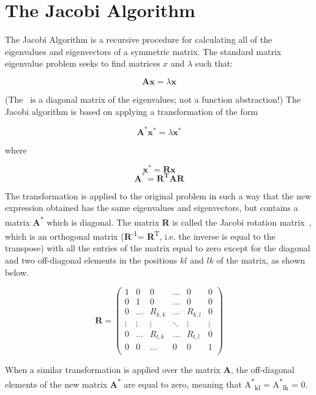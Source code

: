 \documentclass{tmr}
\begin{document}
\section{The Jacobi Algorithm}

The Jacobi Algorithm is a recursive procedure for calculating all of the
eigenvalues and eigenvectors of a symmetric matrix.
%
The standard matrix eigenvalue problem seeks to find matrices $x$ and $\lambda$
such that:

\[\mathbf{Ax} = \lambda \mathbf{x}  \]

(The \textlambda\ is a diagonal matrix of the eigenvalues; not a
function abstraction!)
%
The Jacobi algorithm is based on applying a transformation of the form

\[\mathbf{A^*x^*} = \lambda \mathbf{x^*}  \]

where

\[\mathbf{x^*} = \mathbf{Rx} \]
\[\mathbf{A^*} = \mathbf{R^TAR} \]

The transformation is applied to the original problem in such a way that
the new expression obtained has the same eigenvalues and eigenvectors,
but contains a matrix {\textbf A\textsuperscript{*}} which is diagonal.
%
The matrix {\bf R} is called the Jacobi rotation matrix~\cite{Jacobi},
which is an orthogonal matrix ({\textbf R\textsuperscript{-1}}= {\textbf
R\textsuperscript{T}}, i.e. the inverse is equal to the transpose) with
all the entries of the matrix equal to zero except for the diagonal and
two off-diagonal elements in the positions $kl$ and $lk$ of the matrix,
as shown below.

\[
 \mathbf{R} =
\begin{pmatrix}
1 & 0 & 0 & \hdots & 0 & 0 \\
0 & 1 & 0 & \hdots & 0 & 0 \\
0 & \hdots & R_{k,k} & \hdots & R_{k,l} &  0 \\ 
\vdots & \vdots & \vdots & \ddots & \vdots & \vdots \\
0 &  \hdots & R_{l,k} & \hdots & R_{l,l} & 0 \\
0 & 0 & \hdots & 0 & 0 & 1 \\ 
\end{pmatrix}
\]

When a similar transformation is applied over the matrix
{\textbf A}, the off-diagonal elements of the new matrix {\textbf A\textsuperscript{*}} are equal
to zero, meaning that 
{A\textsuperscript{*}\textsubscript{kl}} = {A\textsuperscript{*}\textsubscript{lk}} = 0.
\end{document}
